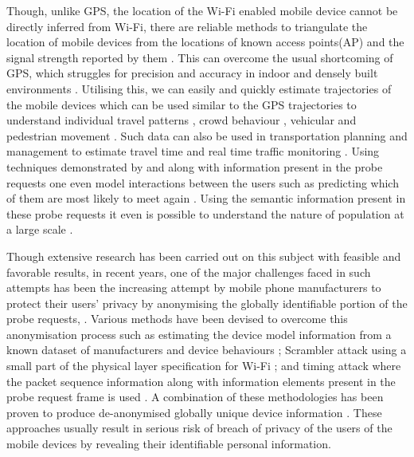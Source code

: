 Though, unlike GPS, the location of the Wi-Fi enabled mobile device cannot be directly inferred from Wi-Fi, there are reliable methods to triangulate the location of mobile devices from the locations of known access points(AP) and the signal strength reported by them \citep{he2003range, moore2004robust, lamarca2005place}.
This can overcome the usual shortcoming of GPS, which struggles for precision and accuracy in indoor and densely built environments \citep{zarim2006,kawaguchi2009wifi, xi2010locating}. 
Utilising this, we can easily and quickly estimate trajectories of the mobile devices \citep{Sorensenlocation,musa2012tracking} which can be used similar to the GPS trajectories to understand individual travel patterns \citep{reki2007,Sap2015}, crowd behaviour \citep{abedi2013bluetooth,mowafi2013tracking}, vehicular \citep{lu2010vehicle} and pedestrian movement \citep{xu2013pedestrian,fukuzaki2014pedestrian,wang2016gait}.
Such data can also be used in transportation planning and management to estimate travel time \citep{musa2011wiflow} and real time traffic monitoring \citep{abbott2013empirical}.
Using techniques demonstrated by \cite{franklin2006passive} and \cite{pang2007802} along with information present in the probe requests one even model interactions between the users \citep{cheng2012inferring,barbera2013signals,cunche2014know,cunche2014linking} such as predicting which of them are most likely to meet again \citep{cunche2012know}.
Using the semantic information present in these probe requests it even is possible to understand the nature of population at a large scale \citep{di2016mind}. 

Though extensive research has been carried out on this subject with feasible and favorable results, in recent years, one of the major challenges faced in such attempts has been the increasing attempt by mobile phone manufacturers to protect their users’ privacy by anonymising the globally identifiable portion of the probe requests, \citep{green2008}.
Various methods have been devised to overcome this anonymisation process such as estimating the device model information from a known dataset of manufacturers and device behaviours \citep{martin2016decomposition}; Scrambler attack using a small part of the physical layer specification for Wi-Fi \citep{vo2016,bloessl2015scrambler}; and timing attack where the packet sequence information along with information elements present in the probe request frame is used \citep{matte2016,cheng2016can}.
A combination of these methodologies has been proven to produce de-anonymised globally unique device information \citep{vanhoef2016, martin2017}.
These approaches usually result in serious risk of breach of privacy of the users of the mobile devices by revealing their identifiable personal information.

